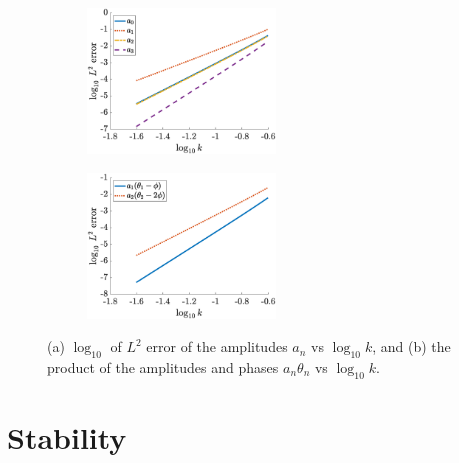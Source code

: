 \documentclass[11pt,reqno]{amsart}
\begin{document}
\begin{figure}
    \centering
    \begin{subfigure}{0.4\linewidth}
        \caption{}
        \label{fig:m6errora}
        \includegraphics[width=5cm]{N6aerror.eps}
    \end{subfigure}
    \begin{subfigure}{0.4\linewidth}
        \caption{}
        \label{fig:m6errorb}
        \includegraphics[width=5cm]{N6athetaerror.eps}
    \end{subfigure}
    \caption{(a) $\log_{10}$ of $L^2$ error of the amplitudes $a_n$ vs $\log_{10} k$, and (b) the product of the amplitudes and phases $a_n \theta_n $ vs $\log_{10} k$.}
    \label{fig:m6error}
\end{figure}

\section{Stability}\label{sec:stability}
\end{document}
